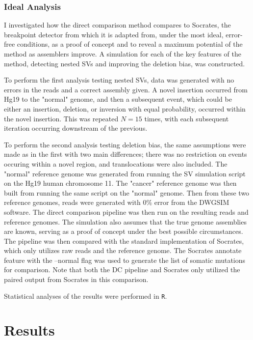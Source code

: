 \documentclass{easychithesis}
\begin{document}
\subsection{Ideal Analysis}
I investigated how the direct comparison method compares to Socrates, the breakpoint detector from which it is adapted from, under the most ideal, error-free conditions, as a proof of concept and to reveal a maximum potential of the method as assemblers improve. A simulation for each of the key features of the method, detecting nested SVs and improving the deletion bias, was constructed. 

To perform the first analysis testing nested SVs, data was generated with no errors in the reads and a correct assembly given. A novel insertion occurred from Hg19 to the "normal" genome, and then a subsequent event, which could be either an insertion, deletion, or inversion with equal probability, occurred within the novel insertion. This was repeated $N = 15$ times, with each subsequent iteration occurring downstream of the previous.

To perform the second analysis testing deletion bias, the same assumptions were made as in the first with two main differences; there was no restriction on events occuring within a novel region, and translocations were also included. The "normal" reference genome was generated from running the SV simulation script on the Hg19 human chromosome 11. The "cancer" reference genome was then built from running the same script on the "normal" genome. Then from these two reference genomes, reads were generated with 0\% error from the DWGSIM software. The direct comparison pipeline was then run on the resulting reads and reference genomes. The simulation also assumes that the true genome assemblies are known, serving as a proof of concept under the best possible circumstances. The pipeline was then compared with the standard implementation of Socrates, which only utilizes raw reads and the reference genome. The Socrates annotate feature with the --normal flag was used to generate the list of somatic mutations for comparison. Note that both the DC pipeline and Socrates only utilized the paired output from Socrates in this comparison.

Statistical analyses of the results were performed in \texttt{R}.

\chapter{Results}
\end{document}
